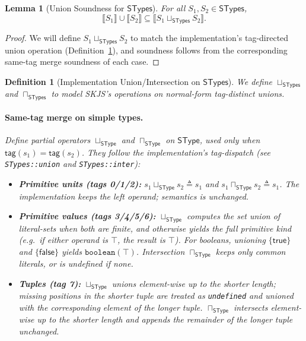 \documentclass[11pt]{article}
\newtheorem{lemma}[theorem]{Lemma}
\newtheorem{definition}[theorem]{Definition}
\newcommand{\sem}[1]{\llbracket #1 \rrbracket}
\newcommand{\SType}{\mathsf{SType}}
\newcommand{\STypes}{\mathsf{STypes}}
\newcommand{\tagfn}{\mathsf{tag}}
\begin{document}
\begin{lemma}[Union Soundness for \(\STypes\)]
\label{lem:stypes-union-sound}
For all \(S_1,S_2 \in \STypes\),
\[
\sem{S_1} \cup \sem{S_2} \subseteq \sem{S_1 \sqcup_{\STypes} S_2}.
\]
\end{lemma}

\begin{proof}
We will define \(S_1 \sqcup_{\STypes} S_2\) to match the implementation's tag-directed union operation (Definition~\ref{def:stypes-union-inter}), and soundness follows from the corresponding same-tag merge soundness of each case.
\end{proof}

\begin{definition}[Implementation Union/Intersection on $\STypes$]
\label{def:stypes-union-inter}
We define \(\sqcup_{\STypes}\) and \(\sqcap_{\STypes}\) to model SKJS's operations on normal-form tag-distinct unions.

\paragraph{Same-tag merge on simple types.}
Define partial operators \(\sqcup_{\SType}\) and \(\sqcap_{\SType}\) on \(\SType\), used only when \(\tagfn(s_1)=\tagfn(s_2)\).
They follow the implementation's tag-dispatch (see \texttt{STypes::union} and \texttt{STypes::inter}):
\begin{itemize}
\item \textbf{Primitive units (tags 0/1/2):}
  \(s_1 \sqcup_{\SType} s_2 \triangleq s_1\) and \(s_1 \sqcap_{\SType} s_2 \triangleq s_1\).
  The implementation keeps the left operand; semantics is unchanged.

\item \textbf{Primitive values (tags 3/4/5/6):}
  \(\sqcup_{\SType}\) computes the set union of literal-sets when both are finite, and otherwise yields the full primitive kind (e.g.\ if either operand is \(\top\), the result is \(\top\)).
  For booleans, unioning \(\{\mathsf{true}\}\) and \(\{\mathsf{false}\}\) yields \(\texttt{boolean}(\top)\).
  Intersection \(\sqcap_{\SType}\) keeps only common literals, or is undefined if none.

\item \textbf{Tuples (tag 7):}
  \(\sqcup_{\SType}\) unions element-wise up to the shorter length; missing positions in the shorter tuple are treated as \texttt{undefined} and unioned with the corresponding element of the longer tuple.
  \(\sqcap_{\SType}\) intersects element-wise up to the shorter length and appends the remainder of the longer tuple unchanged.


\end{itemize}
\end{definition}
\end{document}

